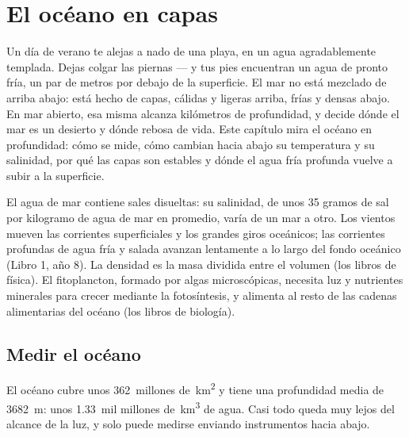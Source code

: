 \chapter{El océano en capas}\label{ch:g10:layered-ocean}

Un día de verano te alejas a nado de una playa, en un agua agradablemente
templada. Dejas colgar las piernas --- y tus pies encuentran un agua de pronto
fría, un par de metros por debajo de la superficie. El mar no está mezclado
de arriba abajo: está hecho de capas, cálidas y ligeras arriba, frías y
densas abajo. En mar abierto, esa misma  alcanza kilómetros de
profundidad, y decide dónde el mar es un desierto y dónde rebosa de vida. Este
capítulo mira el océano en profundidad: cómo se mide, cómo cambian hacia abajo
su temperatura y su salinidad, por qué las capas son estables y dónde el agua
fría profunda vuelve a subir a la superficie.

\begin{recall}
El agua de mar contiene sales disueltas: su salinidad, de unos 35 gramos de
sal por kilogramo de agua de mar en promedio, varía de un mar a otro. Los
vientos mueven las corrientes superficiales y los grandes giros oceánicos;
las corrientes profundas de agua fría y salada avanzan lentamente a lo largo
del fondo oceánico (Libro 1, año 8). La densidad es la masa dividida entre el
volumen (los libros de física). El fitoplancton, formado por algas
microscópicas, necesita luz y nutrientes minerales para crecer mediante la
fotosíntesis, y alimenta al resto de las cadenas alimentarias del océano (los
libros de biología).
\end{recall}

\section{Medir el océano}

El océano cubre unos \num{362}~millones de~\unit{km^2} y tiene una profundidad
media de \qty{3682}{m}: unos \num{1.33}~mil millones de~\unit{km^3} de agua. Casi
todo queda muy lejos del alcance de la luz, y solo puede medirse enviando
instrumentos hacia abajo.


